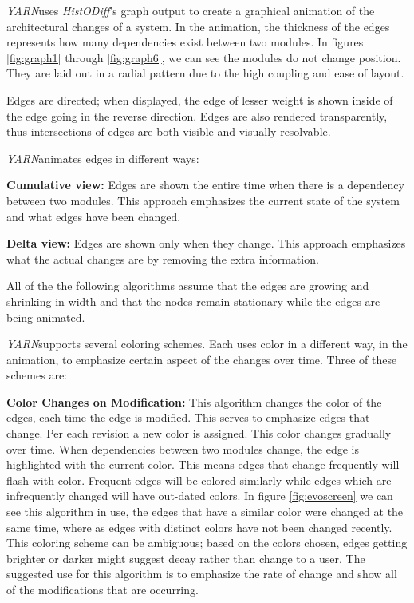 \documentclass[times, 10pt,twocolumn]{article}
\newcommand{\histodiff}{\emph{HistODiff}\xspace}
\newcommand{\yarn}{\emph{YARN\xspace}}
\newcommand{\YARN}{\yarn}
\begin{document}
\yarn uses \histodiff's graph output to create a graphical animation
of the architectural changes of a system. In the animation, the
thickness of the edges represents how many dependencies exist between
two modules.
In figures \ref{fig:graph1} through \ref{fig:graph6}, we can see the
modules do not change position. They are laid out in a radial pattern
due to the high coupling and ease of layout.



Edges are directed; when displayed, the edge of lesser weight is shown
inside of the edge going in the reverse direction.  Edges are also rendered
transparently, thus intersections of edges are both visible and visually
resolvable.

\YARN animates edges in different ways:

\newcommand{\hilight}[1]{\textbf{#1}}

\hilight{Cumulative view:} Edges are shown the entire time when there
is a dependency between two modules. This approach emphasizes the current
state of the system and what edges have been changed.

\hilight{Delta view:} Edges are shown only when they change.  This
approach emphasizes what the actual changes are by removing the extra
information.

All of the the following algorithms assume that the edges are growing
and shrinking in width and that the nodes remain stationary while the
edges are being animated.

\YARN supports several coloring schemes. Each uses color in a different way,
in the animation, to emphasize certain aspect of the changes over time.
Three of these schemes are:



\label{sec:coloring}


\hilight{Color Changes on Modification:} This algorithm changes the
color of the edges, each time the edge is modified. This serves to
emphasize edges that change.  Per each revision a new color is
assigned. This color changes gradually over time.  When dependencies
between two modules change, the edge is highlighted with the current
color. This means edges that change frequently will flash with color.
Frequent edges will be colored similarly while edges which are
infrequently changed will have out-dated colors.  In figure
\ref{fig:evoscreen} we can see this algorithm in use, the edges that
have a similar color were changed at the same time, where as edges
with distinct colors have not been changed recently.  This
coloring scheme can be ambiguous; based on the colors chosen,
edges getting brighter or darker might suggest decay rather than
change to a user.  The suggested use for this algorithm is to emphasize
the rate of change and show all of the modifications that are occurring.
\end{document}

